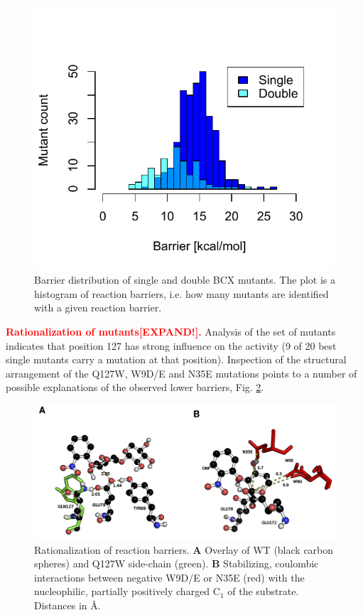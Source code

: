 \begin{figure}[htbp] 
\centering
\includegraphics[width=0.95\linewidth]{barrier-distribution.pdf}
\caption{
Barrier distribution of single and double BCX mutants\cite{hediger2013computational}.
The plot is a histogram of reaction barriers, i.e. how many mutants are identified with a given reaction barrier.
}
\label{fig:bcx_barrier_distribution}
\end{figure}
\newline
\textbf{\textcolor{red}{Rationalization of mutants[EXPAND!].}}
Analysis of the set of mutants indicates that position 127 has strong influence on the activity (9 of 20 best single mutants carry a mutation at that position).
Inspection of the structural arrangement of the Q127W, W9D/E and N35E mutations points to a number of possible explanations of the observed lower barriers, Fig. \ref{fig:bcx_rationalization}.
\begin{figure}[htbp] 
\centering
\includegraphics[width=0.99\linewidth]{analyse-charge.png}
\caption{
Rationalization of reaction barriers.
\textbf{A} Overlay of WT (black carbon spheres) and Q127W side-chain (green).
\textbf{B} Stabilizing, coulombic interactions between negative W9D/E or N35E (red) with the nucleophilic, partially positively charged C$_1$ of the substrate.
Distances in \AA\cite{hediger2013computational}.
}
\label{fig:bcx_rationalization}
\end{figure}
